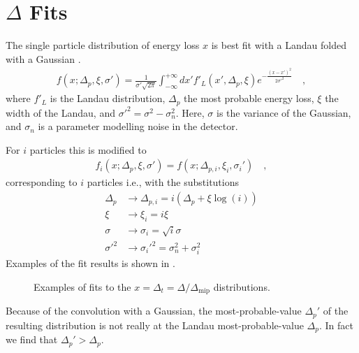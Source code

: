 \section{$\Delta$ Fits}
\label{sec:fits}

The single particle distribution of energy loss $x$ is best fit with a
Landau folded with a Gaussian \cite{nim:b1:16,phyrev:a28:615}.
\begin{align} 
  \label{eq:f}
 f(x;\Delta_p,\xi,\sigma') = \frac{1}{\sigma' \sqrt{2 \pi}}
 \int_{-\infty}^{+\infty} dx' f'_{L}(x',\Delta_p,\xi)
 e^{-\frac{(x-x')^2}{2\sigma'^2}}\quad,
\end{align}
where $ f'_{L}$ is the Landau distribution, $\Delta_p$ the most
probable energy loss, $ \xi$ the width of the Landau, and $
\sigma'^2=\sigma^2-\sigma_n^2 $.  Here, $\sigma$ is the variance of
the Gaussian, and $\sigma_n$ is a parameter modelling noise in the
detector.

For $i$ particles this is modified to 
\begin{align}
  f_i(x;\Delta_{p},\xi,\sigma')=f(x;\Delta_{p,i},\xi_i,\sigma_i')\quad,
\end{align}
corresponding to $ i$ particles i.e., with the substitutions 
\begin{align*}
  \Delta_p  &\rightarrow \Delta_{p,i} = i\left(\Delta_p + \xi\log(i)\right)\\
  \xi       &\rightarrow \xi_i       = i \xi\\
  \sigma    &\rightarrow \sigma_i    = \sqrt{i}\sigma\\
  \sigma'^2 &\rightarrow \sigma_i'^2 = \sigma_n^2 + \sigma_i^2
\end{align*}
Examples of the fit results is shown in .

\begin{figure}[h!tbp]
  \centering
  \caption{Examples of fits to the $x=\Delta_t=\Delta/\Delta_{\text{mip}}$
    distributions.}
  \label{fig:fits:examples}
\end{figure}

Because of the convolution with a Gaussian, the most-probable-value
$\Delta_p'$ of the resulting distribution is not really at the
Landau most-probable-value $\Delta_p$.  In fact we find that
$\Delta_p' > \Delta_p$.

